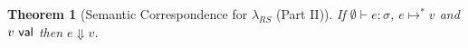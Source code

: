 \documentclass[11pt,leqno]{article}
\newtheorem{trthm}[tr]{Theorem}
\theoremstyle{definition}
\newcommand{\lambdas}{\lambda_{RS}}
\newcommand{\val}{{\sf val}}
\newcommand{\sreduces}{ \Downarrow }
\begin{document}
%

\begin{trthm}[Semantic Correspondence for $\lambdas$ (Part II)]
If $\emptyset\vdash e : \sigma$, $e \mapsto^* v$ and $v \ \val$ then $e \sreduces v$.  
\end{trthm}
\end{document}
